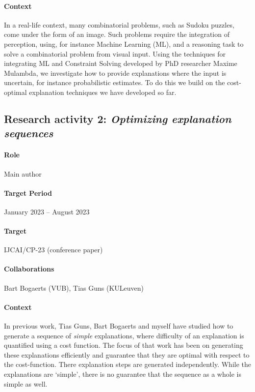 \documentclass{article}
\begin{document}
	\paragraph{Context} In a real-life context, many combinatorial problems, such as Sudoku puzzles, come under the form of an image. Such problems require the integration of perception, using, for instance Machine Learning (ML), and a reasoning task to solve a combinatorial problem from visual input. 
	Using the techniques for integrating ML and Constraint Solving developed by PhD researcher Maxime Mulambda, we investigate how to provide explanations where the input is uncertain, for instance probabilistic estimates.
	To do this we build on the cost-optimal explanation techniques we have developed so far. 
	
	\subsection{Research activity 2: \emph{Optimizing explanation sequences}}
	\paragraph{Role}Main author
	\paragraph{Target Period}January 2023 – August 2023
	\paragraph{Target}IJCAI/CP-23 (conference paper)
	\paragraph{Collaborations}Bart Bogaerts (VUB), Tias Guns (KULeuven)
	
	\paragraph{Context} In previous work, Tias Guns, Bart Bogaerts and myself have studied how to generate a sequence of \emph{simple} explanations, where difficulty of an explanation is quantified using a cost function. The focus of that work has been on generating these explanations efficiently and guarantee that they are optimal with respect to the cost-function. There explanation steps are generated independently.
	While the explanations are `simple', there is no guarantee that the sequence as a whole is simple as well.
	
\end{document}
